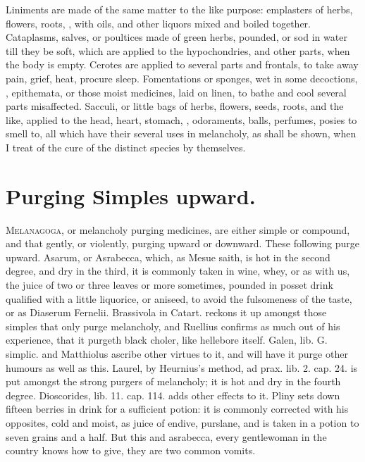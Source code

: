 {Liniments are made of the same matter to the like purpose: emplasters
of herbs, flowers, roots, \etc{}, with oils, and other liquors mixed and
boiled together.
Cataplasms, salves, or poultices made of green herbs, pounded, or sod
in water till they be soft, which are applied to the hypochondries, and
other parts, when the body is empty.
Cerotes are applied to several parts and frontals, to take away pain,
grief, heat, procure sleep. Fomentations or sponges, wet in some
decoctions, \etc{}, epithemata, or those moist medicines, laid on linen,
to bathe and cool several parts misaffected.
Sacculi, or little bags of herbs, flowers, seeds, roots, and the like,
applied to the head, heart, stomach, \etc{}, odoraments, balls, perfumes,
posies to smell to, all which have their several uses in melancholy, as
shall be shown, when I treat of the cure of the distinct species by
themselves.


\section{Purging Simples upward.}
\lettrine{M}{elanagoga}, or melancholy purging medicines, are either simple or
compound, and that gently, or violently, purging upward or downward.
These following purge upward. Asarum, or Asrabecca, which, as
Mesue saith, is hot in the second degree, and dry in the third, it is
commonly taken in wine, whey, or as with us, the juice of two or three
leaves or more sometimes, pounded in posset drink qualified with a
little liquorice, or aniseed, to avoid the fulsomeness of the taste, or
as Diaserum Fernelii. Brassivola in Catart. reckons it up amongst those
simples that only purge melancholy, and Ruellius confirms as much out
of his experience, that it purgeth black choler, like hellebore
itself. Galen, lib. G. simplic. and Matthiolus ascribe other
virtues to it, and will have it purge other humours as well as this.
Laurel, by Heurnius's method, ad prax. lib. 2. cap. 24. is put amongst
the strong purgers of melancholy; it is hot and dry in the fourth
degree. Dioscorides, lib. 11. cap. 114. adds other effects to it.
Pliny sets down fifteen berries in drink for a sufficient potion:
it is commonly corrected with his opposites, cold and moist, as juice
of endive, purslane, and is taken in a potion to seven grains and a
half. But this and asrabecca, every gentlewoman in the country knows
how to give, they are two common vomits.

}
